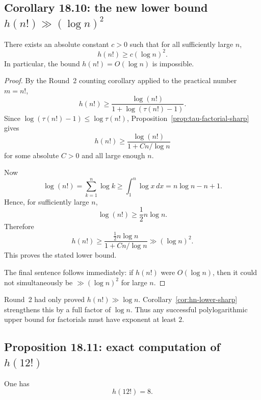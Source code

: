 \subsection{Corollary 18.10: the new lower bound \(h(n!)\gg (\log n)^2\)}

\begin{corollary}[Corollary~18.10]\label{cor:hn-lower-sharp}
There exists an absolute constant \(c>0\) such that for all sufficiently large \(n\),
\[
h(n!) \ge c(\log n)^2.
\]
In particular, the bound \(h(n!)=O(\log n)\) is impossible.
\end{corollary}

\begin{proof}
By the Round~2 counting corollary applied to the practical number \(m=n!\),
\[
h(n!)\ge \frac{\log(n!)}{1+\log(\tau(n!)-1)}.
\]
Since \(\log(\tau(n!)-1)\le \log\tau(n!)\), Proposition~\ref{prop:tau-factorial-sharp} gives
\[
h(n!)\ge \frac{\log(n!)}{1+C n/\log n}
\]
for some absolute \(C>0\) and all large enough \(n\).

Now
\[
\log(n!)=\sum_{k=1}^{n}\log k
\ge \int_1^{n}\log x\,dx
= n\log n-n+1.
\]
Hence, for sufficiently large \(n\),
\[
\log(n!)\ge \frac12 n\log n.
\]
Therefore
\[
h(n!)\ge \frac{\frac12 n\log n}{1+C n/\log n}
\gg (\log n)^2.
\]
This proves the stated lower bound.

The final sentence follows immediately: if \(h(n!)\) were \(O(\log n)\), then it could not simultaneously be \(\gg (\log n)^2\) for large \(n\).
\end{proof}

\begin{remark}
Round~2 had only proved \(h(n!)\gg \log n\). Corollary~\ref{cor:hn-lower-sharp} strengthens this by a full factor of \(\log n\). Thus any successful polylogarithmic upper bound for factorials must have exponent at least \(2\).
\end{remark}

\subsection{Proposition 18.11: exact computation of \(h(12!)\)}

\begin{proposition}[Proposition~18.11]\label{prop:h12}
One has
\[
h(12!)=8.
\]
\end{proposition}

